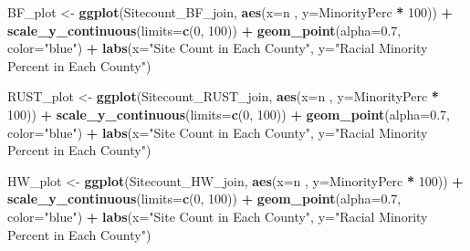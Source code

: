 \documentclass[12pt,]{article}
\newenvironment{Shaded}{\begin{snugshade}}{\end{snugshade}}
\newcommand{\KeywordTok}[1]{\textcolor[rgb]{0.13,0.29,0.53}{\textbf{#1}}}
\newcommand{\DataTypeTok}[1]{\textcolor[rgb]{0.13,0.29,0.53}{#1}}
\newcommand{\DecValTok}[1]{\textcolor[rgb]{0.00,0.00,0.81}{#1}}
\newcommand{\FloatTok}[1]{\textcolor[rgb]{0.00,0.00,0.81}{#1}}
\newcommand{\StringTok}[1]{\textcolor[rgb]{0.31,0.60,0.02}{#1}}
\newcommand{\OperatorTok}[1]{\textcolor[rgb]{0.81,0.36,0.00}{\textbf{#1}}}
\newcommand{\NormalTok}[1]{#1}
\begin{document}
\begin{Shaded}
\begin{Highlighting}[]
\NormalTok{BF_plot <-}\StringTok{ }
\StringTok{  }\KeywordTok{ggplot}\NormalTok{(Sitecount_BF_join, }\KeywordTok{aes}\NormalTok{(}\DataTypeTok{x=}\NormalTok{n , }\DataTypeTok{y=}\NormalTok{MinorityPerc }\OperatorTok{*}\StringTok{ }\DecValTok{100}\NormalTok{)) }\OperatorTok{+}
\StringTok{  }\KeywordTok{scale_y_continuous}\NormalTok{(}\DataTypeTok{limits=}\KeywordTok{c}\NormalTok{(}\DecValTok{0}\NormalTok{, }\DecValTok{100}\NormalTok{)) }\OperatorTok{+}
\StringTok{  }\KeywordTok{geom_point}\NormalTok{(}\DataTypeTok{alpha=}\FloatTok{0.7}\NormalTok{, }\DataTypeTok{color=}\StringTok{"blue"}\NormalTok{) }\OperatorTok{+}
\StringTok{  }\KeywordTok{labs}\NormalTok{(}\DataTypeTok{x=}\StringTok{"Site Count in Each County"}\NormalTok{, }\DataTypeTok{y=}\StringTok{"Racial Minority Percent in Each County"}\NormalTok{)}

\NormalTok{RUST_plot <-}\StringTok{ }
\StringTok{  }\KeywordTok{ggplot}\NormalTok{(Sitecount_RUST_join, }\KeywordTok{aes}\NormalTok{(}\DataTypeTok{x=}\NormalTok{n , }\DataTypeTok{y=}\NormalTok{MinorityPerc }\OperatorTok{*}\StringTok{ }\DecValTok{100}\NormalTok{)) }\OperatorTok{+}
\StringTok{  }\KeywordTok{scale_y_continuous}\NormalTok{(}\DataTypeTok{limits=}\KeywordTok{c}\NormalTok{(}\DecValTok{0}\NormalTok{, }\DecValTok{100}\NormalTok{)) }\OperatorTok{+}
\StringTok{  }\KeywordTok{geom_point}\NormalTok{(}\DataTypeTok{alpha=}\FloatTok{0.7}\NormalTok{, }\DataTypeTok{color=}\StringTok{"blue"}\NormalTok{) }\OperatorTok{+}
\StringTok{  }\KeywordTok{labs}\NormalTok{(}\DataTypeTok{x=}\StringTok{"Site Count in Each County"}\NormalTok{, }\DataTypeTok{y=}\StringTok{"Racial Minority Percent in Each County"}\NormalTok{)}

\NormalTok{HW_plot <-}\StringTok{ }
\StringTok{  }\KeywordTok{ggplot}\NormalTok{(Sitecount_HW_join, }\KeywordTok{aes}\NormalTok{(}\DataTypeTok{x=}\NormalTok{n , }\DataTypeTok{y=}\NormalTok{MinorityPerc }\OperatorTok{*}\StringTok{ }\DecValTok{100}\NormalTok{)) }\OperatorTok{+}
\StringTok{  }\KeywordTok{scale_y_continuous}\NormalTok{(}\DataTypeTok{limits=}\KeywordTok{c}\NormalTok{(}\DecValTok{0}\NormalTok{, }\DecValTok{100}\NormalTok{)) }\OperatorTok{+}
\StringTok{  }\KeywordTok{geom_point}\NormalTok{(}\DataTypeTok{alpha=}\FloatTok{0.7}\NormalTok{, }\DataTypeTok{color=}\StringTok{"blue"}\NormalTok{) }\OperatorTok{+}
\StringTok{   }\KeywordTok{labs}\NormalTok{(}\DataTypeTok{x=}\StringTok{"Site Count in Each County"}\NormalTok{, }\DataTypeTok{y=}\StringTok{"Racial Minority Percent in Each County"}\NormalTok{)}
\end{Highlighting}
\end{Shaded}
\end{document}
